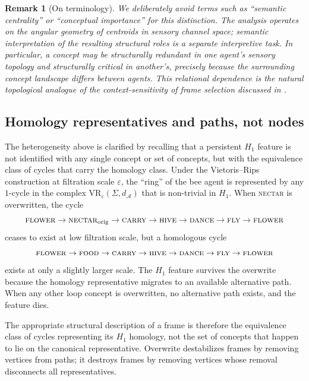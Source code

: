 \documentclass[12pt]{article}
\newtheorem{remark}{Remark}
\begin{document}
\begin{remark}[On terminology]
We deliberately avoid terms such as ``semantic centrality'' or
``conceptual importance'' for this distinction. The analysis
operates on the angular geometry of centroids in sensory channel
space; semantic interpretation of the resulting structural roles is
a separate interpretive task. In particular, a concept may be
structurally redundant in one agent's sensory topology and
structurally critical in another's, precisely because the
surrounding concept landscape differs between agents. This
relational dependence is the natural topological analogue of the
context-sensitivity of frame selection discussed in
\cite{minamoto2026hallucination}.
\end{remark}

\subsection*{Homology representatives and paths, not nodes}

The heterogeneity above is clarified by recalling that a persistent
$H_1$ feature is not identified with any single concept or set of
concepts, but with the equivalence class of cycles that carry the
homology class. Under the Vietoris--Rips construction at filtration
scale $\varepsilon$, the ``ring'' of the bee agent is represented
by any $1$-cycle in the complex $\mathrm{VR}_\varepsilon(\Sigma,
d_\mathcal{A})$ that is non-trivial in $H_1$. When
\textsc{nectar} is overwritten, the cycle
\[
\textsc{flower} \to \textsc{nectar}_\mathrm{orig} \to \textsc{carry}
  \to \textsc{hive} \to \textsc{dance} \to \textsc{fly} \to
  \textsc{flower}
\]
ceases to exist at low filtration scale, but a homologous cycle
\[
\textsc{flower} \to \textsc{food} \to \textsc{carry} \to \textsc{hive}
  \to \textsc{dance} \to \textsc{fly} \to \textsc{flower}
\]
exists at only a slightly larger scale. The $H_1$ feature survives
the overwrite because the homology representative migrates to an
available alternative path. When any other loop concept is
overwritten, no alternative path exists, and the feature dies.

The appropriate structural description of a frame is therefore the
equivalence class of cycles representing its $H_1$ homology, not
the set of concepts that happen to lie on the canonical
representative. Overwrite destabilizes frames by removing vertices
from paths; it destroys frames by removing vertices whose removal
disconnects all representatives.
\end{document}
